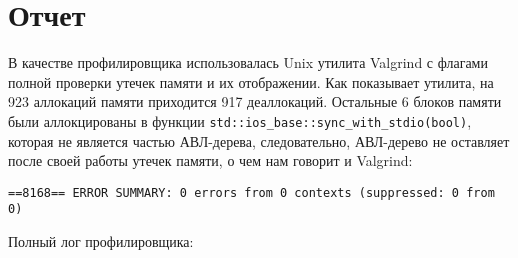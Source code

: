\section{Отчет}
В качестве профилировщика использовалась Unix утилита Valgrind с флагами полной проверки утечек памяти и их отображении. Как показывает утилита, на 923 аллокаций памяти приходится 917 деаллокаций. Остальные 6 блоков памяти были аллокцированы в функции \lstinline{std::ios_base::sync_with_stdio(bool)}, которая не является частью АВЛ-дерева, следовательно, АВЛ-дерево не оставляет после своей работы утечек памяти, о чем нам говорит и Valgrind:
\begin{Verbatim}
==8168== ERROR SUMMARY: 0 errors from 0 contexts (suppressed: 0 from 0)
\end{Verbatim}

Полный лог профилировщика:\\
